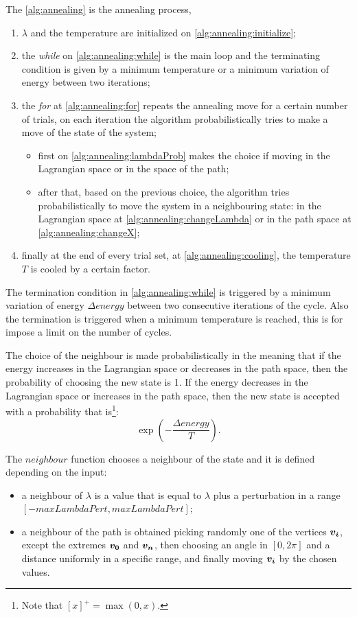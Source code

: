 \documentclass[dissertation.tex]{subfiles}
\begin{document}
The \cref{alg:annealing} is the annealing process,
\begin{enumerate}
\item $\lambda$ and the
  temperature are initialized on
  \cref{alg:annealing:initialize};
\item the \emph{while} on
  \cref{alg:annealing:while} is the main loop and the terminating
  condition is given by a minimum temperature or a minimum variation of
  energy between two iterations;
\item the \emph{for} at
  \cref{alg:annealing:for} repeats the annealing move for a certain
  number of trials, on each iteration the algorithm probabilistically
  tries to make a move of the state of the system;
  \begin{itemize}
  \item first on
    \cref{alg:annealing:lambdaProb} makes the choice if moving in the
    Lagrangian space or in the space of the path;
  \item after that, based on the previous
    choice, the algorithm tries probabilistically to move the system
    in a neighbouring
    state: in the
    Lagrangian space at
    \cref{alg:annealing:changeLambda} or in the path space at
    \cref{alg:annealing:changeX};
  \end{itemize}
\item finally at the end of every trial set,
  at \cref{alg:annealing:cooling}, the temperature $T$ is cooled by
  a certain factor.
\end{enumerate}

The termination condition in \cref{alg:annealing:while} is triggered by a
minimum variation of energy $\Delta energy$ between two consecutive
iterations of the cycle. Also the termination is triggered when a
minimum temperature is reached, this is for impose a limit on the
number of cycles.

The choice of the neighbour is made
probabilistically in the meaning that if the energy increases in the
Lagrangian space or decreases in the path space, then the probability of
choosing the new state is 1. If the energy decreases in the Lagrangian
space or increases in the path space, then the new state is accepted
with a probability that is\footnote{Note that $[x]^+=\max(0,x)$.}:
$$\exp(-\frac{\Delta energy}{T}).$$

The $neighbour$ function chooses a neighbour of the state and it is
defined depending on the input:
\begin{itemize}
  \item a neighbour of $\lambda$ is a value that is equal to $\lambda$
    plus a perturbation in a range $[-maxLambdaPert, maxLambdaPert]$;
  \item a neighbour of the path is obtained picking randomly one of
    the vertices $\boldsymbol{v_i}$, except the extremes $\boldsymbol{v_0}$ and $\boldsymbol{v_n}$,
    then choosing an angle in $[0,2\pi]$ and a distance
    uniformly in a specific range, and finally moving $\boldsymbol{v_i}$ by
    the chosen values.
\end{itemize}
\end{document}
